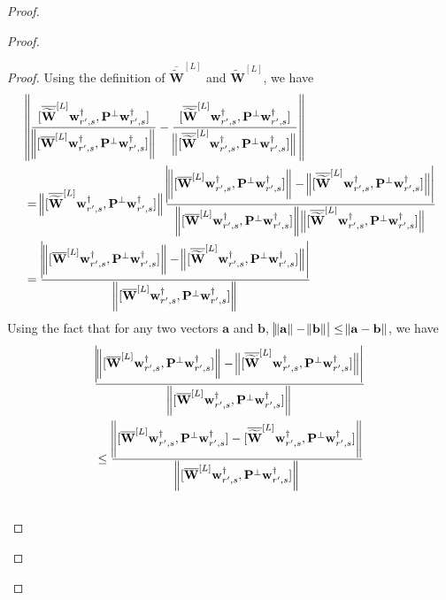 \begin{claim}
\begin{proof}
\begin{proof}
					
					\begin{proof}
						Using the definition of $\overline{\widetilde{\mathbf{W}}}^{[L]}$ and $\widetilde{\mathbf{W}}^{[L]}$, we have
						\begin{align*}
							&\norm{\frac{[\overline{\widetilde{\mathbf{W}}}^{[L]} \mathbf{w}_{r', s}^{\dagger}, \mathbf{P}^{\perp}\mathbf{w}_{r', s}^{\dagger}]}{\norm{[\overline{\mathbf{W}}^{[L]} \mathbf{w}_{r', s}^{\dagger}, \mathbf{P}^{\perp}\mathbf{w}_{r', s}^{\dagger}]}} - \frac{[\overline{\widetilde{\mathbf{W}}}^{[L]} \mathbf{w}_{r', s}^{\dagger}, \mathbf{P}^{\perp}\mathbf{w}_{r', s}^{\dagger}]}{\norm[2]{[\overline{\widetilde{\mathbf{W}}}^{[L]} \mathbf{w}_{r', s}^{\dagger}, \mathbf{P}^{\perp}\mathbf{w}_{r', s}^{\dagger}]}}} \\&
							= \norm[2]{[\overline{\widetilde{\mathbf{W}}}^{[L]} \mathbf{w}_{r', s}^{\dagger}, \mathbf{P}^{\perp}\mathbf{w}_{r', s}^{\dagger}]} \frac{ \abs{\norm{[\overline{\mathbf{W}}^{[L]} \mathbf{w}_{r', s}^{\dagger}, \mathbf{P}^{\perp}\mathbf{w}_{r', s}^{\dagger}]} -  \norm[2]{[\overline{\widetilde{\mathbf{W}}}^{[L]} \mathbf{w}_{r', s}^{\dagger}, \mathbf{P}^{\perp}\mathbf{w}_{r', s}^{\dagger}]}}}{\norm{[\overline{\mathbf{W}}^{[L]} \mathbf{w}_{r', s}^{\dagger}, \mathbf{P}^{\perp}\mathbf{w}_{r', s}^{\dagger}]} \norm[2]{[\overline{\widetilde{\mathbf{W}}}^{[L]} \mathbf{w}_{r', s}^{\dagger}, \mathbf{P}^{\perp}\mathbf{w}_{r', s}^{\dagger}]}} \\&
							= \frac{\abs{\norm{[\overline{\mathbf{W}}^{[L]} \mathbf{w}_{r', s}^{\dagger}, \mathbf{P}^{\perp}\mathbf{w}_{r', s}^{\dagger}]} -  \norm[2]{[\overline{\widetilde{\mathbf{W}}}^{[L]} \mathbf{w}_{r', s}^{\dagger}, \mathbf{P}^{\perp}\mathbf{w}_{r', s}^{\dagger}]}}}{\norm{[\overline{\mathbf{W}}^{[L]} \mathbf{w}_{r', s}^{\dagger}, \mathbf{P}^{\perp}\mathbf{w}_{r', s}^{\dagger}]} }
						\end{align*}
						Using the fact that for any two vectors $\mathbf{a}$ and $\mathbf{b}$, $\abs{\norm{\mathbf{a}} - \norm{\mathbf{b}}} \le \norm{\mathbf{a} - \mathbf{b}}$, we have    
						\begin{align}
							&
							\frac{\abs{\norm{[\overline{\mathbf{W}}^{[L]} \mathbf{w}_{r', s}^{\dagger}, \mathbf{P}^{\perp}\mathbf{w}_{r', s}^{\dagger}]} -  \norm[2]{[\overline{\widetilde{\mathbf{W}}}^{[L]} \mathbf{w}_{r', s}^{\dagger}, \mathbf{P}^{\perp}\mathbf{w}_{r', s}^{\dagger}]}}}{\norm{[\overline{\mathbf{W}}^{[L]} \mathbf{w}_{r', s}^{\dagger}, \mathbf{P}^{\perp}\mathbf{w}_{r', s}^{\dagger}]} } \nonumber
							\\&\le \frac{\norm{[\overline{\mathbf{W}}^{[L]} \mathbf{w}_{r', s}^{\dagger}, \mathbf{P}^{\perp}\mathbf{w}_{r', s}^{\dagger}] - [\overline{\widetilde{\mathbf{W}}}^{[L]} \mathbf{w}_{r', s}^{\dagger}, \mathbf{P}^{\perp}\mathbf{w}_{r', s}^{\dagger}]}}{\norm{[\overline{\mathbf{W}}^{[L]} \mathbf{w}_{r', s}^{\dagger}, \mathbf{P}^{\perp}\mathbf{w}_{r', s}^{\dagger}]} }\nonumber \\&

\end{align}
\end{proof}
\end{proof}
\end{proof}
\end{claim}
